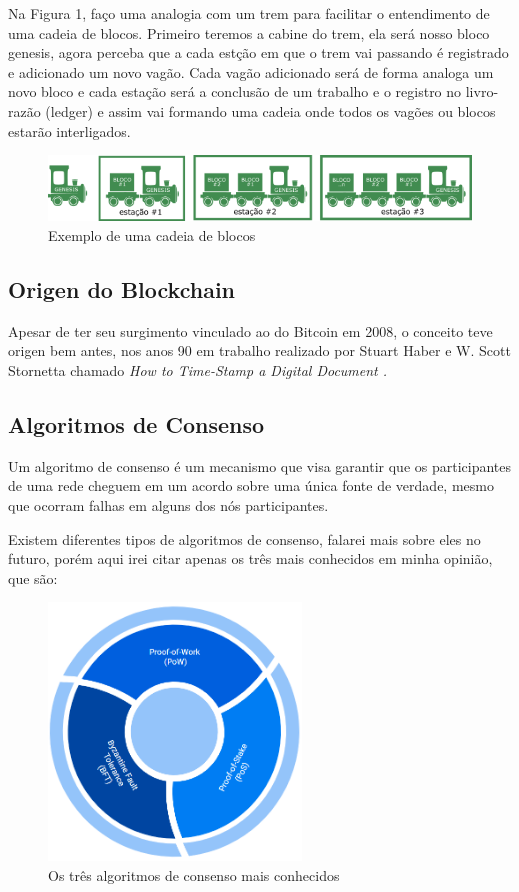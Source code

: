 \documentclass[a4paper,11pt]{article}
\begin{document}
Na Figura 1, faço uma analogia com um trem para facilitar o entendimento de uma cadeia de blocos. Primeiro teremos a cabine do trem, ela será nosso bloco genesis, agora perceba que a cada estção em que o trem vai passando é registrado e adicionado um novo vagão. Cada vagão adicionado será de forma analoga um novo bloco e cada estação será a conclusão de um trabalho e o registro no livro-razão (ledger) e assim vai formando uma cadeia onde todos os vagões ou blocos estarão interligados.
\begin{figure}[H]
	\centering
	\includegraphics[width=1.0\textwidth]{imagens/conceito-blocos-trem.png}
	\caption{Exemplo de uma cadeia de blocos}
\end{figure}

\subsection{Origen do Blockchain}
Apesar de ter seu surgimento vinculado ao do Bitcoin\cite{bitcoin} em 2008, o conceito teve origen bem antes, nos anos 90 em trabalho realizado por Stuart Haber\cite{staurthaber} e W. Scott Stornetta\cite{scottstornetta} chamado \itshape How to Time-Stamp a Digital Document\cite{criadoresblockchain} \normalshape.

\subsection{Algoritmos de Consenso}
Um algoritmo de consenso é um mecanismo que visa garantir que os participantes de uma rede cheguem em um acordo sobre uma única fonte de verdade, mesmo que ocorram falhas em alguns dos nós participantes.

Existem diferentes tipos de algoritmos de consenso, falarei mais sobre eles no futuro, porém aqui irei citar apenas os três mais conhecidos em minha opinião, que são:
\begin{figure}[H]
	\centering
	\includegraphics[width=0.6\textwidth]{imagens/algoritmos-consenso.png}
	\caption{Os três algoritmos de consenso mais conhecidos}
\end{figure}
\end{document}
